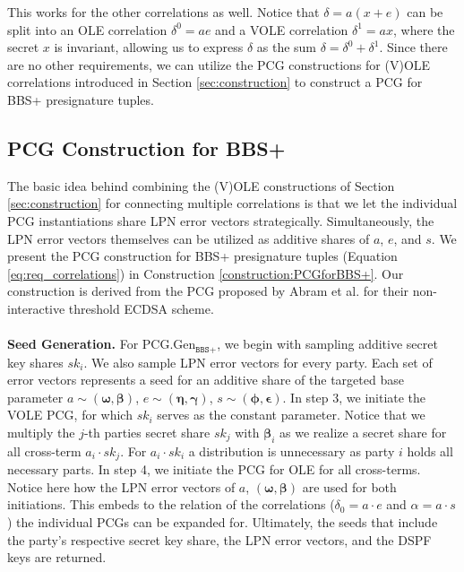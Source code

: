 This works for the other correlations as well. Notice that $\delta = a(x+e)$ can be split into an OLE correlation $\delta^0 = ae$ and a VOLE correlation $\delta^1 = ax$, where the secret $x$ is invariant, allowing us to express $\delta$ as the sum $\delta = \delta^0 + \delta^1$. Since there are no other requirements, we can utilize the PCG constructions for (V)OLE correlations introduced in Section \ref{sec:construction} to construct a PCG for BBS+ presignature tuples.

\subsection{PCG Construction for BBS+}
\label{subsec:pcgForBBs+}
The basic idea behind combining the (V)OLE constructions of Section \ref{sec:construction} for connecting multiple correlations is that we let the individual PCG instantiations share LPN error vectors strategically. Simultaneously, the LPN error vectors themselves can be utilized as additive shares of $a$, $e$, and $s$. We present the PCG construction for BBS+ presignature tuples (Equation \ref{eq:req_correlations}) in Construction \ref{construction:PCGforBBS+}. Our construction is derived from the PCG proposed by Abram et al. \cite{abram2022low} for their non-interactive threshold ECDSA scheme.
\\\\
\textbf{Seed Generation.} For PCG.Gen$_{\texttt{BBS+}}$, we begin with sampling additive secret key shares $sk_i$. We also sample LPN error vectors for every party. Each set of error vectors represents a seed for an additive share of the targeted base parameter $a \sim (\boldsymbol{\omega}, \boldsymbol{\beta})$, $e \sim (\boldsymbol{\eta}, \boldsymbol{\gamma})$, $s \sim (\boldsymbol{\phi}, \boldsymbol{\epsilon})$. In step 3, we initiate the VOLE PCG, for which $sk_i$ serves as the constant parameter. Notice that we multiply the $j$-th parties secret share $sk_j$ with $\boldsymbol{\beta}_i$ as we realize a secret share for all cross-term $a_i\cdot sk_j$. For $a_i\cdot sk_i$ a distribution is unnecessary as party $i$ holds all necessary parts. In step 4, we initiate the PCG for OLE for all cross-terms. Notice here how the LPN error vectors of $a$, $(\boldsymbol{\omega}, \boldsymbol{\beta})$ are used for both initiations. This embeds to the relation of the correlations ($\delta_0 = a\cdot e$ and $\alpha = a\cdot s$) the individual PCGs can be expanded for. Ultimately, the seeds that include the party's respective secret key share, the LPN error vectors, and the DSPF keys are returned.

